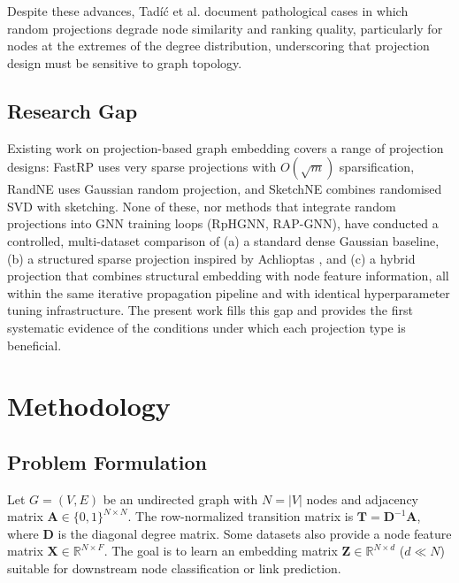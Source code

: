 \documentclass[conference]{IEEEtran}
\begin{document}
Despite these advances, Tad\'{i}\'{c} et al. \cite{tadic2024} document
pathological cases in which random projections degrade node similarity
and ranking quality, particularly for nodes at the extremes of the degree
distribution, underscoring that projection design must be sensitive to
graph topology.

\subsection{Research Gap}

Existing work on projection-based graph embedding covers a range of
projection designs: FastRP \cite{chen2019fast} uses very sparse
projections with $O(\sqrt{m})$ sparsification, RandNE \cite{zhang2018randne}
uses Gaussian random projection, and SketchNE \cite{xie2023sketchne}
combines randomised SVD with sketching. None of these, nor methods that
integrate random projections into GNN training loops (RpHGNN, RAP-GNN),
have conducted a controlled, multi-dataset comparison of
(a) a standard dense Gaussian baseline,
(b) a structured sparse projection inspired by Achlioptas \cite{achlioptas2003},
and (c) a hybrid projection that combines structural embedding with node
feature information, all within the same iterative propagation pipeline
and with identical hyperparameter tuning infrastructure.
The present work fills this gap and provides the first systematic evidence
of the conditions under which each projection type is beneficial.

\section{Methodology}
\label{sec:method}

\subsection{Problem Formulation}

Let $G = (V, E)$ be an undirected graph with $N = |V|$ nodes and adjacency
matrix $\mathbf{A} \in \{0,1\}^{N \times N}$. The row-normalized transition
matrix is $\mathbf{T} = \mathbf{D}^{-1}\mathbf{A}$, where $\mathbf{D}$ is
the diagonal degree matrix. Some datasets also provide a node feature matrix
$\mathbf{X} \in \mathbb{R}^{N \times F}$. The goal is to learn an embedding
matrix $\mathbf{Z} \in \mathbb{R}^{N \times d}$ ($d \ll N$) suitable for
downstream node classification or link prediction.
\end{document}
